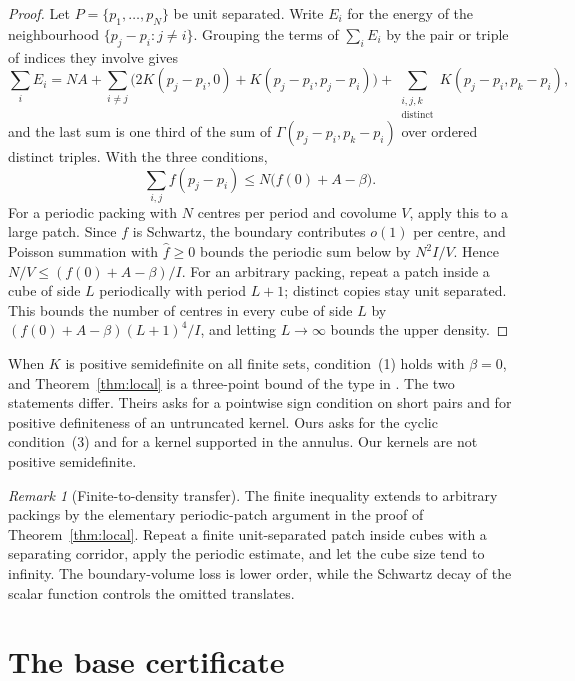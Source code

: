 \documentclass[11pt]{amsart}
\numberwithin{equation}{section}
\theoremstyle{remark}
\newtheorem{remark}[theorem]{Remark}
\newcommand{\Gam}{\Gamma}
\begin{document}
\begin{proof}
Let $P=\{p_1,\dots,p_N\}$ be unit separated. Write $E_i$ for the energy of the neighbourhood $\{p_j-p_i:j\ne i\}$. Grouping the terms of $\sum_iE_i$ by the pair or triple of indices they involve gives
\begin{equation}\label{eq:grouping}
\sum_iE_i=NA+\sum_{i\ne j}\bigl(2K(p_j-p_i,0)+K(p_j-p_i,p_j-p_i)\bigr)+\sum_{\substack{i,j,k\\\text{distinct}}}K(p_j-p_i,p_k-p_i),
\end{equation}
and the last sum is one third of the sum of $\Gam(p_j-p_i,p_k-p_i)$ over ordered distinct triples. With the three conditions,
\[
\sum_{i,j}f(p_j-p_i)\le N\bigl(f(0)+A-\beta\bigr).
\]
For a periodic packing with $N$ centres per period and covolume $V$, apply this to a large patch. Since $f$ is Schwartz, the boundary contributes $o(1)$ per centre, and Poisson summation with $\hat f\ge0$ bounds the periodic sum below by $N^2I/V$. Hence $N/V\le(f(0)+A-\beta)/I$. For an arbitrary packing, repeat a patch inside a cube of side $L$ periodically with period $L+1$; distinct copies stay unit separated. This bounds the number of centres in every cube of side $L$ by $(f(0)+A-\beta)(L+1)^4/I$, and letting $L\to\infty$ bounds the upper density.
\end{proof}

When $K$ is positive semidefinite on all finite sets, condition~(1) holds with $\beta=0$, and Theorem~\ref{thm:local} is a three-point bound of the type in \cite[Theorem~1.1]{CdLS}. The two statements differ. Theirs asks for a pointwise sign condition on short pairs and for positive definiteness of an untruncated kernel. Ours asks for the cyclic condition~(3) and for a kernel supported in the annulus. Our kernels are not positive semidefinite.

\begin{remark}[Finite-to-density transfer]\label{rem:transfer}
The finite inequality extends to arbitrary packings by the elementary periodic-patch argument in the proof of Theorem~\ref{thm:local}. Repeat a finite unit-separated patch inside cubes with a separating corridor, apply the periodic estimate, and let the cube size tend to infinity. The boundary-volume loss is lower order, while the Schwartz decay of the scalar function controls the omitted translates.
\end{remark}

\section{The base certificate}\label{sec:v7}
\end{document}
